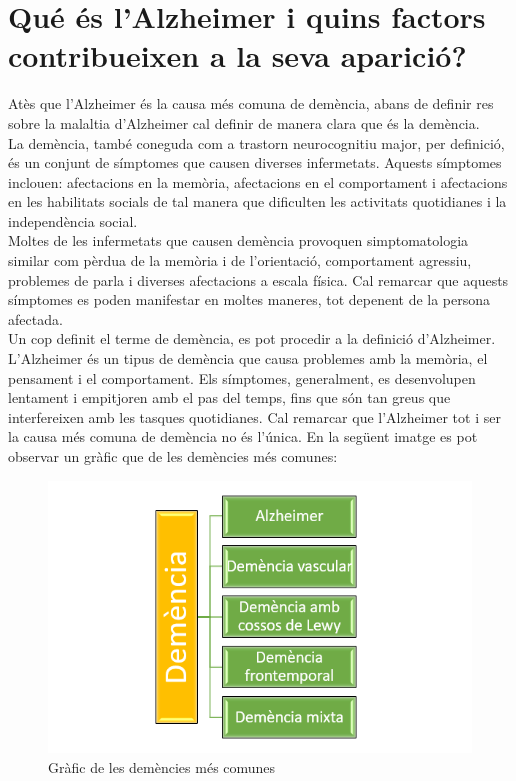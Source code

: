 \documentclass[a4paper,12pt]{report}
\begin{document}
\section*{Qué és l'Alzheimer i quins factors contribueixen a la seva aparició?}
Atès que l'Alzheimer és la causa més comuna de demència, abans de definir res sobre la malaltia d'Alzheimer cal definir de manera clara que és la demència.\\
La demència, també coneguda com a trastorn neurocognitiu major, per definició, és un conjunt de símptomes que causen diverses infermetats. Aquests símptomes inclouen: afectacions en la memòria, afectacions en el comportament i afectacions en les habilitats socials de tal manera que dificulten les activitats quotidianes i la independència social.\\
Moltes de les infermetats que causen demència provoquen simptomatologia similar com pèrdua de la memòria i de l'orientació, comportament agressiu, problemes de parla i diverses afectacions a escala física. Cal remarcar que aquests símptomes es poden manifestar en moltes maneres, tot depenent de la persona afectada.\\
Un cop definit el terme de demència, es pot procedir a la definició d'Alzheimer.\\
L'Alzheimer és un tipus de demència que causa problemes amb la memòria, el pensament i el comportament. Els símptomes, generalment, es desenvolupen lentament i empitjoren amb el pas del temps, fins que són tan greus que interfereixen amb les tasques quotidianes. Cal remarcar que l'Alzheimer tot i ser la causa més comuna de demència no és l'única. En la següent imatge es pot observar un gràfic que de les demències més comunes:
\begin{figure}[H]
    \centering
    \includegraphics[scale = 0.5]{images/image_2023-03-08_172829369.png}
    \caption{Gràfic de les demències més comunes}
    \label{fig:demències}
\end{figure}
\end{document}
